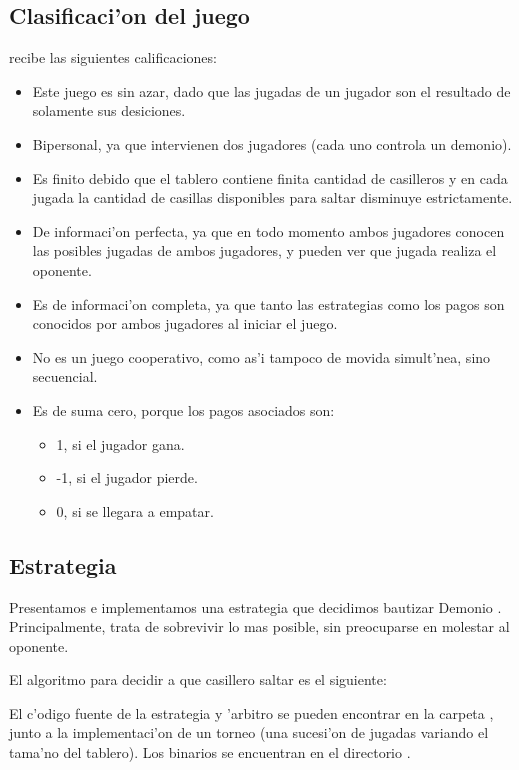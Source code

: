 \subsection{Clasificaci'on del juego}
 recibe las siguientes calificaciones:
\begin{itemize}
\item Este juego es sin azar, dado que las jugadas de un jugador son el resultado de solamente sus desiciones.
\item Bipersonal, ya que intervienen dos jugadores (cada uno controla un demonio).
\item Es finito debido que el tablero contiene finita cantidad de casilleros y en cada jugada la cantidad de casillas disponibles para saltar disminuye estrictamente.
\item De informaci'on perfecta, ya que en todo momento ambos jugadores conocen las posibles jugadas de ambos jugadores, y pueden ver que jugada realiza el oponente.
\item Es de informaci'on completa, ya que tanto las estrategias como los pagos son conocidos por ambos jugadores al iniciar el juego.
\item No es un juego cooperativo, como as'i tampoco de movida simult'nea, sino secuencial.
\item Es de suma cero, porque los pagos asociados son:
	\begin{itemize}
	\item 1, si el jugador gana.
	\item -1, si el jugador pierde.
	\item 0, si se llegara a empatar.
	\end{itemize}
\end{itemize}


\subsection{Estrategia}
Presentamos e implementamos una estrategia que decidimos bautizar Demonio . Principalmente, trata de sobrevivir lo mas posible, sin preocuparse en molestar al oponente. 

El algoritmo para decidir a que casillero saltar es el siguiente:





El c'odigo fuente de la estrategia y 'arbitro se pueden encontrar en la carpeta , junto a la implementaci'on de un torneo (una sucesi'on de jugadas variando el tama'no del tablero). Los binarios se encuentran en el directorio .


